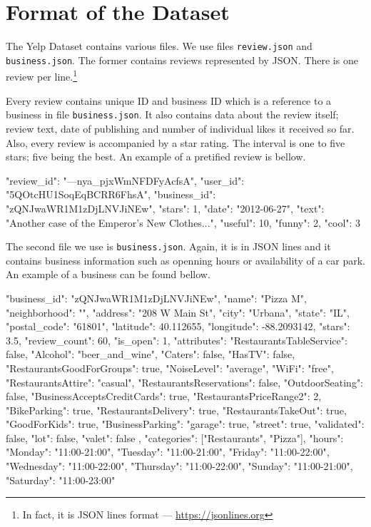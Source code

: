 \section{Format of the Dataset}\label{sec:format}

The Yelp Dataset contains various files.
We use files \texttt{review.json} and \texttt{business.json}.
The former contains reviews represented by JSON.
There is one review per line.\footnote{In fact, it is JSON lines format --- \url{https://jsonlines.org}}

Every review contains unique ID and business ID which is a reference to a business in file \texttt{business.json}.
It also contains data about the review itself; review text, date of publishing and number of individual likes it received so far.
Also, every review is accompanied by a star rating.
The interval is one to five stars; five being the best.
An example of a pretified review is bellow.

\begin{code}
{
	"review_id": "---nya_pjxWmNFDFyAcfsA",
	"user_id": "5QOtcHU1SoqEqBCRR6FhsA",
	"business_id": "zQNJwaWR1M1zDjLNVJiNEw",
	"stars": 1,
	"date": "2012-06-27",
	"text": "Another case of the Emperor's New Clothes...",
	"useful": 10,
	"funny": 2,
	"cool": 3
}
\end{code}

The second file we use is \texttt{business.json}.
Again, it is in JSON lines and it contains business information such as openning hours or availability of a car park.
An example of a business can be found bellow.

\begin{code}
{
	"business_id": "zQNJwaWR1M1zDjLNVJiNEw",
	"name": "Pizza M",
	"neighborhood": "",
	"address": "208 W Main St",
	"city": "Urbana",
	"state": "IL",
	"postal_code": "61801",
	"latitude": 40.112655,
	"longitude": -88.2093142,
	"stars": 3.5,
	"review_count": 60,
	"is_open": 1,
	"attributes": {
		"RestaurantsTableService": false,
		"Alcohol": "beer_and_wine",
		"Caters": false,
		"HasTV": false,
		"RestaurantsGoodForGroups": true,
		"NoiseLevel": "average",
		"WiFi": "free",
		"RestaurantsAttire": "casual",
		"RestaurantsReservations": false,
		"OutdoorSeating": false,
		"BusinessAcceptsCreditCards": true,
		"RestaurantsPriceRange2": 2,
		"BikeParking": true,
		"RestaurantsDelivery": true,
		"RestaurantsTakeOut": true,
		"GoodForKids": true,
		"BusinessParking": {
			"garage": true,
			"street": true,
			"validated": false,
			"lot": false,
			"valet": false
		}
	},
	"categories": ["Restaurants", "Pizza"],
	"hours": {
		"Monday": "11:00-21:00",
		"Tuesday": "11:00-21:00",
		"Friday": "11:00-22:00",
		"Wednesday": "11:00-22:00",
		"Thursday": "11:00-22:00",
		"Sunday": "11:00-21:00",
		"Saturday": "11:00-23:00"
	}
}
\end{code}

